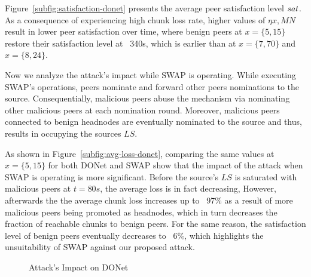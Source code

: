 Figure~\ref{subfig:satisfaction-donet} presents the average peer satisfaction level $sat$.
As a consequence of experiencing high chunk loss rate, higher values of $\eta x, MN$ result in lower peer satisfaction over time, where benign peers at $x=\{5, 15\}$ restore their satisfaction level at ~340s, which is earlier than at $x=\{7, 70\}$ and $x=\{8, 24\}$.

Now we analyze the attack's impact while SWAP is operating.
While executing SWAP's operations, peers nominate and forward other peers nominations to the source. 
Consequentially, malicious peers abuse the mechanism via nominating other malicious peers at each nomination round. 
Moreover, malicious peers connected to benign headnodes are eventually nominated to the source and thus, results in occupying the sources $LS$.

As shown in Figure~\ref{subfig:avg-loss-donet}, comparing the same values at $x=\{5, 15\}$ for both DONet and SWAP show that the impact of the attack when SWAP is operating is more significant.
Before the source's $LS$ is saturated with malicious peers at $t=80s$, the average loss is in fact decreasing, However, afterwards the the average chunk loss increases up to ~97\% as a result of more malicious peers being promoted as headnodes, which in turn decreases the fraction of reachable chunks to benign peers.
For the same reason, the satisfaction level of benign peers eventually decreases to ~6\%, which highlights the unsuitability of SWAP against our proposed attack.

\begin{figure}[t!]
\centering

  \mbox{}
 
  \mbox{}
  \caption{Attack's Impact on DONet}
  \label{fig:attack-results}
  \end{figure}


